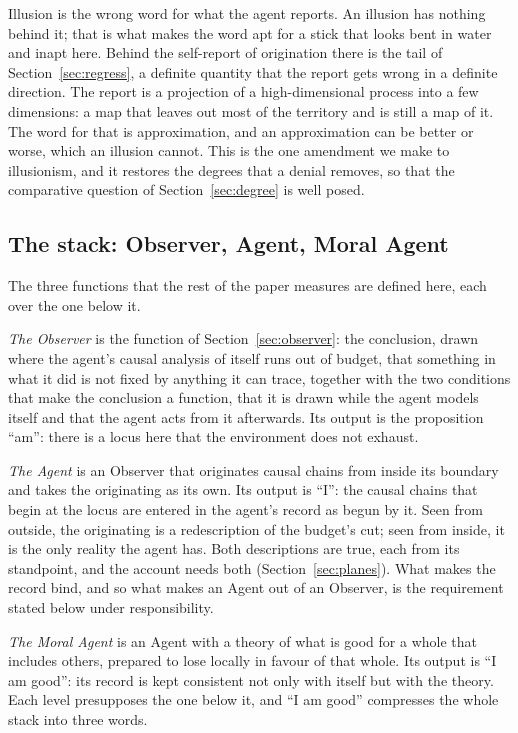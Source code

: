 Illusion is the wrong word for what the agent reports. An illusion has nothing behind it; that is what
makes the word apt for a stick that looks bent in water and inapt here. Behind the self-report of
origination there is the tail of Section~\ref{sec:regress}, a definite quantity that the report gets
wrong in a definite direction. The report is a projection of a high-dimensional process into a few
dimensions: a map that leaves out most of the territory and is still a map of it. The word for that is
approximation, and an approximation can be better or worse, which an illusion cannot. This is the one
amendment we make to illusionism, and it restores the degrees that a denial removes, so that the
comparative question of Section~\ref{sec:degree} is well posed.

\subsection{The stack: Observer, Agent, Moral Agent}
\label{sec:stack}

The three functions that the rest of the paper measures are defined here, each over the one below it.

\emph{The Observer} is the function of Section~\ref{sec:observer}: the conclusion, drawn where the
agent's causal analysis of itself runs out of budget, that something in what it did is not fixed by
anything it can trace, together with the two conditions that make the conclusion a function, that it
is drawn while the agent models itself and that the agent acts from it afterwards. Its output is the
proposition ``am'': there is a locus here that the environment does not exhaust.

\emph{The Agent} is an Observer that originates causal chains from inside its boundary and takes the
originating as its own. Its output is ``I'': the causal chains that begin at the locus are entered in
the agent's record as begun by it. Seen from outside, the originating is a redescription of the
budget's cut; seen from inside, it is the only reality the agent has. Both descriptions are true, each
from its standpoint, and the account needs both (Section~\ref{sec:planes}). What makes the record
bind, and so what makes an Agent out of an Observer, is the requirement stated below under
responsibility.

\emph{The Moral Agent} is an Agent with a theory of what is good for a whole that includes others,
prepared to lose locally in favour of that whole. Its output is ``I am good'': its record is kept
consistent not only with itself but with the theory. Each level presupposes the one below it, and
``I am good'' compresses the whole stack into three words.

